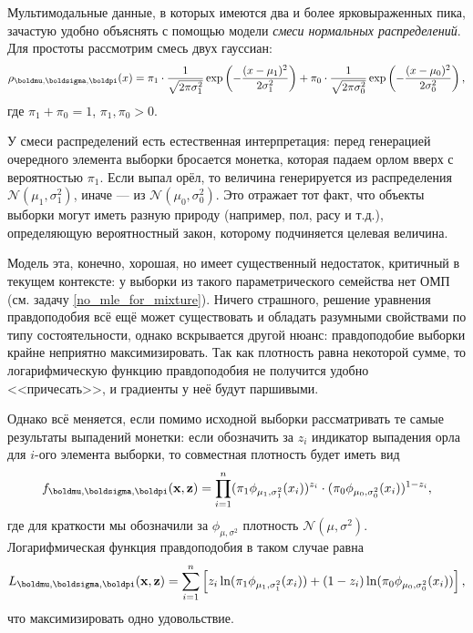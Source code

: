 \begin{example}\label{gauss_mixture}
	Мультимодальные данные, в которых имеются два и более ярковыраженных пика, зачастую удобно объяснять с помощью модели \textit{смеси нормальных распределений}. Для простоты рассмотрим смесь двух гауссиан:
	\begin{equation}\label{normal_mixure}
		\rho_{\boldmu, \boldsigma, \boldpi}(x) = \pi_1 \cdot \frac{1}{\sqrt{2\pi\sigma_1^2}} \exp\left(-\frac{(x-\mu_1)^2}{2\sigma^2_1}\right) + \pi_0 \cdot \frac{1}{\sqrt{2\pi\sigma_0^2}} \exp\left(-\frac{(x-\mu_0)^2}{2\sigma^2_0}\right),
	\end{equation}
	где $\pi_1 + \pi_0 = 1$, $\pi_1, \pi_0 > 0$.
	
	У смеси распределений есть естественная интерпретация: перед генерацией очередного элемента выборки бросается монетка, которая падаем орлом вверх с вероятностью $\pi_1$. Если выпал орёл, то величина генерируется из распределения $\mathcal{N}(\mu_1, \sigma^2_1)$, иначе --- из $\mathcal{N}(\mu_0, \sigma^2_0)$. Это отражает тот факт, что объекты выборки могут иметь разную природу (например, пол, расу и т.д.), определяющую вероятностный закон, которому подчиняется целевая величина.
	
	Модель эта, конечно, хорошая, но имеет существенный недостаток, критичный в текущем контексте: у выборки из такого параметрического семейства нет ОМП (см. задачу \ref{no_mle_for_mixture}). Ничего страшного, решение уравнения правдоподобия всё ещё может существовать и обладать разумными свойствами по типу состоятельности, однако вскрывается другой нюанс: правдоподобие выборки крайне неприятно максимизировать. Так как плотность равна некоторой сумме, то логарифмическую функцию правдоподобия не получится удобно <<причесать>>, и градиенты у неё будут паршивыми.
	
	Однако всё меняется, если помимо исходной выборки рассматривать те самые результаты выпадений монетки: если обозначить за $z_i$ индикатор выпадения орла для $i$-ого элемента выборки, то совместная плотность будет иметь вид
	\[
	f_{\boldmu, \boldsigma, \boldpi}(\mathbf x, \mathbf z) = \prod_{i=1}^n (\pi_1\phi_{\mu_1, \sigma_1^2}(x_i))^{z_i} \cdot (\pi_0\phi_{\mu_0, \sigma_0^2}(x_i))^{1 - z_i},
	\]
	где для краткости мы обозначили за $\phi_{\mu, \sigma^2}$ плотность $\mathcal{N}(\mu, \sigma^2)$. Логарифмическая функция правдоподобия в таком случае равна
	\[
	L_{\boldmu, \boldsigma, \boldpi}(\mathbf x, \mathbf z) = \sum_{i=1}^n \left[z_i \ln (\pi_1\phi_{\mu_1, \sigma_1^2}(x_i)) + (1 - z_i)\ln (\pi_0\phi_{\mu_0, \sigma_0^2}(x_i))\right],
	\]
	что максимизировать одно удовольствие.
\end{example}

